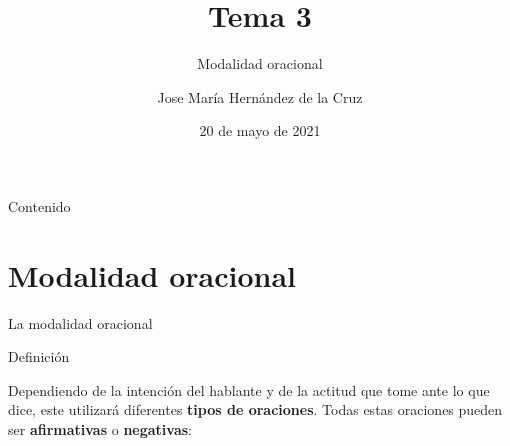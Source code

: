 \documentclass[ignorenonframetext,]{beamer}
\title{Tema 3}
\subtitle{Modalidad oracional}
\author{Jose María Hernández de la Cruz}
\date{20 de mayo de 2021}
\begin{document}
\frame{\titlepage}

\begin{frame}{Contenido}
\protect\hypertarget{contenido}{}

\tableofcontents

\end{frame}

\hypertarget{modalidad-oracional}{%
\section{Modalidad oracional}\label{modalidad-oracional}}

\begin{frame}{La modalidad oracional}
\protect\hypertarget{la-modalidad-oracional}{}

\begin{block}{Definición}

Dependiendo de la intención del hablante y de la actitud que tome ante
lo que dice, este utilizará diferentes \textbf{tipos de oraciones}.
Todas estas oraciones pueden ser \textbf{afirmativas} o
\textbf{negativas}:

\end{block}

\end{frame}
\end{document}
